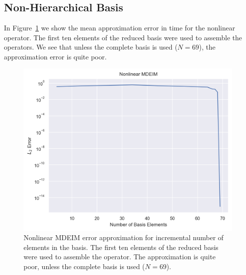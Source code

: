 \documentclass[../../thesis.tex]{subfiles}
\begin{document}
\subsection{Non-Hierarchical Basis}
In Figure~\ref{fig:mdeim_error_approximation} we show the mean approximation error
in time for the nonlinear operator. 
The first ten elements of the reduced basis were used to assemble the operators.
We see that unless the complete basis is used ($N=69$),
the approximation error is quite poor.
\begin{figure}[h]
    \centering
    \includegraphics[width=1\columnwidth]{research_project/piston/figures/mdeim_certification/nonlinear_error_decay.png}
    \caption{Nonlinear MDEIM error approximation for incremental number of elements in the basis.
    The first ten elements of the reduced basis were used to assemble the operator.
    The approximation is quite poor, unless the complete basis is used 
    ($N=69$).}
    \label{fig:mdeim_error_approximation}
\end{figure}
\end{document}
